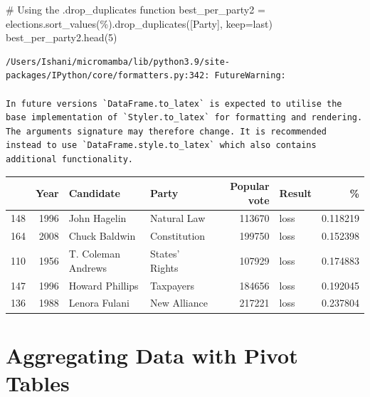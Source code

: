 \documentclass[
  letterpaper,
  DIV=11,
  numbers=noendperiod]{scrreprt}
\newenvironment{Shaded}{\begin{snugshade}}{\end{snugshade}}
\newcommand{\CommentTok}[1]{\textcolor[rgb]{0.37,0.37,0.37}{#1}}
\newcommand{\DecValTok}[1]{\textcolor[rgb]{0.68,0.00,0.00}{#1}}
\newcommand{\NormalTok}[1]{\textcolor[rgb]{0.00,0.23,0.31}{#1}}
\newcommand{\OperatorTok}[1]{\textcolor[rgb]{0.37,0.37,0.37}{#1}}
\newcommand{\StringTok}[1]{\textcolor[rgb]{0.13,0.47,0.30}{#1}}
\begin{document}
\begin{Shaded}
\begin{Highlighting}[]
\CommentTok{\# Using the .drop\_duplicates function}
\NormalTok{best\_per\_party2 }\OperatorTok{=}\NormalTok{ elections.sort\_values(}\StringTok{\textquotesingle{}\%\textquotesingle{}}\NormalTok{).drop\_duplicates([}\StringTok{\textquotesingle{}Party\textquotesingle{}}\NormalTok{], keep}\OperatorTok{=}\StringTok{\textquotesingle{}last\textquotesingle{}}\NormalTok{)}
\NormalTok{best\_per\_party2.head(}\DecValTok{5}\NormalTok{)}
\end{Highlighting}
\end{Shaded}

\begin{verbatim}
/Users/Ishani/micromamba/lib/python3.9/site-packages/IPython/core/formatters.py:342: FutureWarning:

In future versions `DataFrame.to_latex` is expected to utilise the base implementation of `Styler.to_latex` for formatting and rendering. The arguments signature may therefore change. It is recommended instead to use `DataFrame.style.to_latex` which also contains additional functionality.
\end{verbatim}

\begin{tabular}{lrllrlr}
\toprule
{} &  Year &           Candidate &           Party &  Popular vote & Result &         \% \\
\midrule
148 &  1996 &        John Hagelin &     Natural Law &        113670 &   loss &  0.118219 \\
164 &  2008 &       Chuck Baldwin &    Constitution &        199750 &   loss &  0.152398 \\
110 &  1956 &  T. Coleman Andrews &  States' Rights &        107929 &   loss &  0.174883 \\
147 &  1996 &     Howard Phillips &       Taxpayers &        184656 &   loss &  0.192045 \\
136 &  1988 &       Lenora Fulani &    New Alliance &        217221 &   loss &  0.237804 \\
\bottomrule
\end{tabular}

\hypertarget{aggregating-data-with-pivot-tables}{%
\section{Aggregating Data with Pivot
Tables}\label{aggregating-data-with-pivot-tables}}
\end{document}

